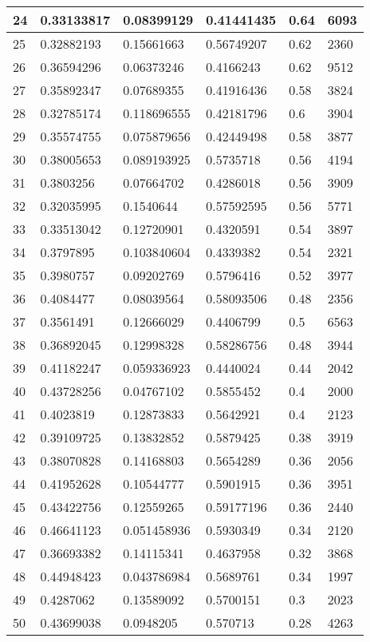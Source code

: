 \begin{longtable}{|l|l|l|l|l|l|}
24 & 0.33133817 & 0.08399129 & 0.41441435 & 0.64 & 6093 \\ \hline 
25 & 0.32882193 & 0.15661663 & 0.56749207 & 0.62 & 2360 \\ \hline 
26 & 0.36594296 & 0.06373246 & 0.4166243 & 0.62 & 9512 \\ \hline 
27 & 0.35892347 & 0.07689355 & 0.41916436 & 0.58 & 3824 \\ \hline 
28 & 0.32785174 & 0.118696555 & 0.42181796 & 0.6 & 3904 \\ \hline 
29 & 0.35574755 & 0.075879656 & 0.42449498 & 0.58 & 3877 \\ \hline 
30 & 0.38005653 & 0.089193925 & 0.5735718 & 0.56 & 4194 \\ \hline 
31 & 0.3803256 & 0.07664702 & 0.4286018 & 0.56 & 3909 \\ \hline 
32 & 0.32035995 & 0.1540644 & 0.57592595 & 0.56 & 5771 \\ \hline 
33 & 0.33513042 & 0.12720901 & 0.4320591 & 0.54 & 3897 \\ \hline 
34 & 0.3797895 & 0.103840604 & 0.4339382 & 0.54 & 2321 \\ \hline 
35 & 0.3980757 & 0.09202769 & 0.5796416 & 0.52 & 3977 \\ \hline 
36 & 0.4084477 & 0.08039564 & 0.58093506 & 0.48 & 2356 \\ \hline 
37 & 0.3561491 & 0.12666029 & 0.4406799 & 0.5 & 6563 \\ \hline 
38 & 0.36892045 & 0.12998328 & 0.58286756 & 0.48 & 3944 \\ \hline 
39 & 0.41182247 & 0.059336923 & 0.4440024 & 0.44 & 2042 \\ \hline 
40 & 0.43728256 & 0.04767102 & 0.5855452 & 0.4 & 2000 \\ \hline 
41 & 0.4023819 & 0.12873833 & 0.5642921 & 0.4 & 2123 \\ \hline 
42 & 0.39109725 & 0.13832852 & 0.5879425 & 0.38 & 3919 \\ \hline 
43 & 0.38070828 & 0.14168803 & 0.5654289 & 0.36 & 2056 \\ \hline 
44 & 0.41952628 & 0.10544777 & 0.5901915 & 0.36 & 3951 \\ \hline 
45 & 0.43422756 & 0.12559265 & 0.59177196 & 0.36 & 2440 \\ \hline 
46 & 0.46641123 & 0.051458936 & 0.5930349 & 0.34 & 2120 \\ \hline 
47 & 0.36693382 & 0.14115341 & 0.4637958 & 0.32 & 3868 \\ \hline 
48 & 0.44948423 & 0.043786984 & 0.5689761 & 0.34 & 1997 \\ \hline 
49 & 0.4287062 & 0.13589092 & 0.5700151 & 0.3 & 2023 \\ \hline 
50 & 0.43699038 & 0.0948205 & 0.570713 & 0.28 & 4263 \\ \hline 
\end{longtable}